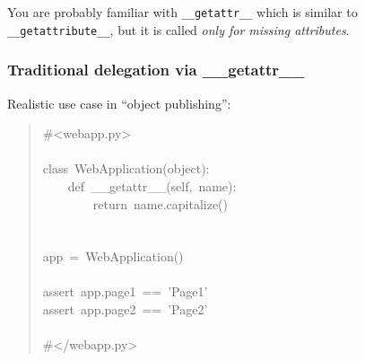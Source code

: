 \documentclass[10pt,a4paper,english]{article}
\begin{document}
You are probably familiar with \texttt{{\_}{\_}getattr{\_}{\_}} which is similar 
to \texttt{{\_}{\_}getattribute{\_}{\_}}, but it is called \emph{only for missing attributes}.



\hypertarget{traditional-delegation-via-getattr}{}
\subsubsection*{Traditional delegation via {\_}{\_}getattr{\_}{\_}}

Realistic use case in ``object publishing'':
\begin{quote}{\ttfamily \raggedright \noindent
{\#}<webapp.py>~\\
~\\
class~WebApplication(object):~\\
~~~~def~{\_}{\_}getattr{\_}{\_}(self,~name):~\\
~~~~~~~~return~name.capitalize()~\\
~\\
~\\
app~=~WebApplication()~\\
~\\
assert~app.page1~==~'Page1'~\\
assert~app.page2~==~'Page2'~\\
~\\
{\#}</webapp.py>
}\end{quote}
\end{document}
